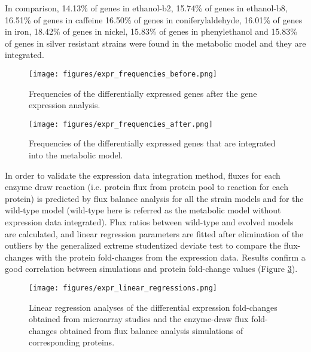 In comparison, 14.13\% of genes in ethanol-b2, 15.74\% of genes in ethanol-b8, 16.51\% of genes in caffeine	16.50\% of genes in coniferylaldehyde, 16.01\% of genes in iron, 18.42\% of genes	in nickel, 15.83\% of genes in phenylethanol and 15.83\%  of genes in silver resistant strains were found in the metabolic model and they are integrated.

\begin{figure}[H]
  \begin{center}
  \texttt{[image: figures/expr\_frequencies\_before.png]}
  \caption[Frequencies of the differentially expressed genes after the gene expression analysis]{Frequencies of the differentially expressed genes after the gene expression analysis.}
  \label{fig:expr_frequencies_before}
  \end{center}
\end{figure}

\begin{figure}[H]
  \begin{center}
  \texttt{[image: figures/expr\_frequencies\_after.png]}
  \caption[Frequencies of the differentially expressed genes that are integrated into the metabolic model]{Frequencies of the differentially expressed genes that are integrated into the metabolic model.}
  \label{fig:expr_frequencies_after}
  \end{center}
\end{figure}

In order to validate the expression data integration method, fluxes for each enzyme draw reaction (i.e. protein flux from protein pool to reaction for each protein) is predicted by flux balance analysis for all the strain models and for the wild-type model (wild-type here is referred as the metabolic model without expression data integrated). Flux ratios between wild-type and evolved models are calculated, and linear regression parameters are fitted after elimination of the outliers by the generalized extreme studentized deviate test to compare the flux-changes with the protein fold-changes from the expression data. Results confirm a good correlation between simulations and protein fold-change values (Figure \ref{fig:expr_linear_regressions}).

\begin{figure}[H]
  \begin{center}
  \texttt{[image: figures/expr\_linear\_regressions.png]}
  \caption[Linear regression analyses of the fold-changes]{Linear regression analyses of the differential expression fold-changes obtained from microarray studies and the enzyme-draw flux fold-changes obtained from flux balance analysis simulations of corresponding proteins.}
  \label{fig:expr_linear_regressions}
  \end{center}
\end{figure}


